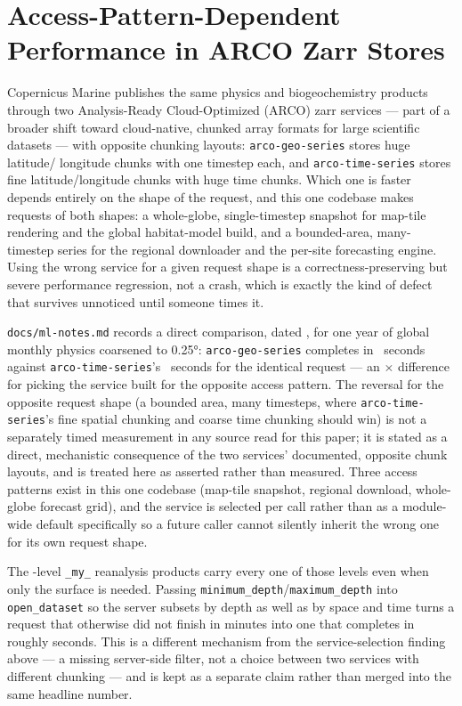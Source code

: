 \section{Access-Pattern-Dependent Performance in ARCO Zarr Stores}
\label{sec:arco}

 Copernicus Marine publishes the same physics and biogeochemistry
products through two Analysis-Ready Cloud-Optimized (ARCO) zarr services ---
part of a broader shift toward cloud-native, chunked array formats for
large scientific datasets \citep{abernathey2021} --- with
opposite chunking layouts: \texttt{arco-geo-series} stores huge latitude/
longitude chunks with one timestep each, and \texttt{arco-time-series} stores
fine latitude/longitude chunks with huge time chunks. Which one is faster
depends entirely on the shape of the request, and this one codebase makes
requests of both shapes: a whole-globe, single-timestep snapshot for map-tile
rendering and the global habitat-model build, and a bounded-area,
many-timestep series for the regional downloader and the per-site
forecasting engine. Using the wrong service for a given request shape is a
correctness-preserving but severe performance regression, not a crash, which
is exactly the kind of defect that survives unnoticed until someone times it.

 \texttt{docs/ml-notes.md} records
a direct comparison, dated \ArcoMeasuredDate{}, for one year of global
monthly physics coarsened to 0.25\si{\degree}: \texttt{arco-geo-series}
completes in \ArcoGeoSeriesSeconds{}~seconds against
\texttt{arco-time-series}'s \ArcoTimeSeriesSeconds{}~seconds for the
identical request --- an \ArcoSlowdownFactor{}$\times$ difference for
picking the service built for the opposite access pattern. The reversal for
the opposite request shape (a bounded area, many timesteps, where
\texttt{arco-time-series}'s fine spatial chunking and coarse time chunking
should win) is not a separately timed measurement in any source read for
this paper; it is stated as a direct, mechanistic consequence of the two
services' documented, opposite chunk layouts, and is treated here as
asserted rather than measured. Three access patterns exist in this one
codebase (map-tile snapshot, regional download, whole-globe forecast grid),
and the service is selected per call rather than as a module-wide default
specifically so a future caller cannot silently inherit the wrong one for
its own request shape.

 The
\ReanalysisDepthLevels{}-level \texttt{\_my\_} reanalysis products carry
every one of those levels even when only the surface is needed. Passing
\texttt{minimum\_depth}/\texttt{maximum\_depth} into \texttt{open\_dataset}
so the server subsets by depth as well as by space and time turns a request
that otherwise did not finish in \ReanalysisUnboundedMinutes{} minutes into
one that completes in roughly \ReanalysisBoundedSeconds{} seconds. This is a
different mechanism from the service-selection finding above --- a missing
server-side filter, not a choice between two services with different
chunking --- and is kept as a separate claim rather than merged into the
same headline number.

